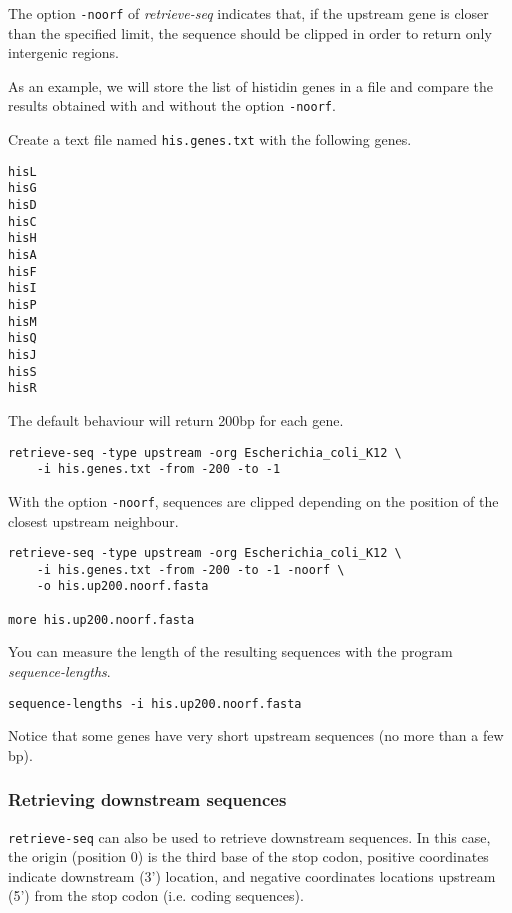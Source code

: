 The option \texttt{-noorf} of \textit{retrieve-seq} indicates that, if
the upstream gene is closer than the specified limit, the sequence
should be clipped in order to return only intergenic regions.

As an example, we will store the list of histidin genes in a file and
compare the results obtained with and without the option
\texttt{-noorf}.

Create a text file named \texttt{his.genes.txt} with the following
genes.

\begin{verbatim}
hisL
hisG
hisD
hisC
hisH
hisA
hisF
hisI
hisP
hisM
hisQ
hisJ
hisS
hisR
\end{verbatim}

The default behaviour will return 200bp for each gene. 

\begin{verbatim}
retrieve-seq -type upstream -org Escherichia_coli_K12 \
    -i his.genes.txt -from -200 -to -1
\end{verbatim}

With the option \texttt{-noorf}, sequences are clipped depending on
the position of the closest upstream neighbour.

\begin{verbatim}
retrieve-seq -type upstream -org Escherichia_coli_K12 \
    -i his.genes.txt -from -200 -to -1 -noorf \
    -o his.up200.noorf.fasta

more his.up200.noorf.fasta
\end{verbatim}

You can measure the length of the resulting sequences with the program
\textit{sequence-lengths}.

\begin{verbatim}
sequence-lengths -i his.up200.noorf.fasta
\end{verbatim}

Notice that some genes have very short upstream sequences (no more
than a few bp).

\subsubsection{Retrieving downstream sequences}

\texttt{retrieve-seq} can also be used to retrieve downstream
sequences. In this case, the origin (position 0) is the third base of
the stop codon, positive coordinates indicate downstream (3')
location, and negative coordinates locations upstream (5') from the
stop codon (i.e. coding sequences). 

